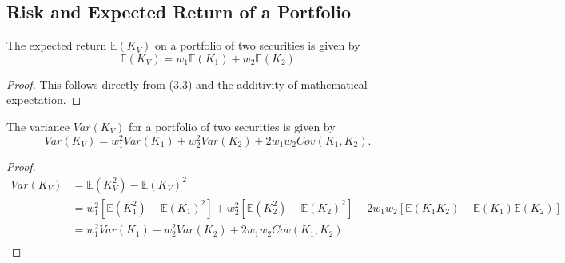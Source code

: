 \subsection{Risk and Expected Return of a Portfolio}
\begin{theorem}
The expected return $\mathbb{E}(K_{V})$ on a portfolio of two securities is given by 
\begin{equation}
    \mathbb{E}(K_{V})=w_{1}\mathbb{E}(K_{1})+w_{2}\mathbb{E}(K_{2})
\end{equation}
\end{theorem}
\begin{proof}
This follows directly from (3.3) and the additivity of mathematical expectation.
\end{proof}
\begin{theorem}
The variance $Var(K_{V})$ for a portfolio of two securities is given by
\begin{equation}
    Var(K_{V})=w_{1}^{2}Var(K_{1})+w_{2}^{2}Var(K_{2})+2w_{1}w_{2}Cov(K_{1},K_{2}).
\end{equation}
\end{theorem}
\begin{proof}
    \begin{align*}
        Var(K_{V})&=\mathbb{E}(K_{V}^{2})-\mathbb{E}(K_{V})^{2}\\
        &=w_{1}^{2}[\mathbb{E}(K_{1}^{2})-\mathbb{E}(K_{1})^{2}]+w_{2}^{2}[\mathbb{E}(K_{2}^{2})-\mathbb{E}(K_{2})^{2}]+2w_{1}w_{2} [\mathbb{E}(K_{1}K_{2})-\mathbb{E}(K_{1})\mathbb{E}(K_{2})]\\
        &=w_{1}^{2}Var(K_{1})+w_{2}^{2}Var(K_{2})+2w_{1}w_{2}Cov(K_{1},K_{2})\\
    \end{align*}
\end{proof}

